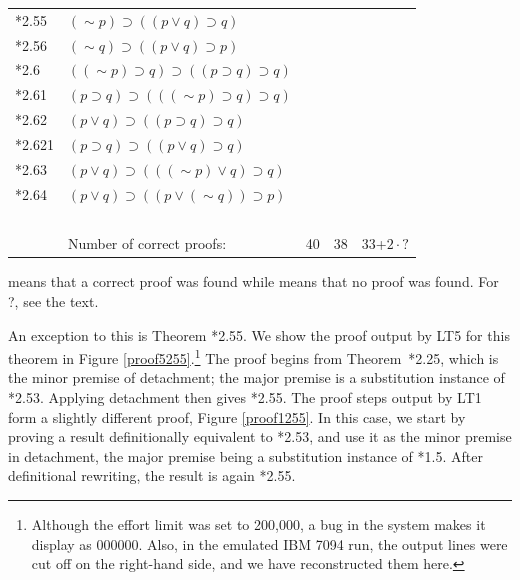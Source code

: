 \documentclass{IEEEcsmag}
\begin{document}
\begin{table}[h]
\begin{tabular}{lllll}
*2.55 & $ (\sim p) \supset ((p \vee q) \supset q) $ & \Y & \ & \Y \\
*2.56 & $ (\sim q) \supset ((p \vee q) \supset p) $ & \Y & \ & \N \\
*2.6 & $( (\sim p) \supset q) \supset ((p \supset q) \supset q) $ & \N & \ & \N \\
*2.61 & $(p \supset q) \supset (( (\sim p) \supset q) \supset q)$ & \Y & \ & \Y \\
*2.62 & $(p \vee q) \supset ((p \supset q) \supset q) $ & \Y & \ & \Y \\
*2.621 & $(p \supset q) \supset ((p \vee q) \supset q) $ & \Y & \ & \Y \\
*2.63 & $(p \vee q) \supset (( (\sim p) \vee q) \supset q) $ & \Y & \ & \Y \\
*2.64 & $(p \vee q) \supset ((p \vee (\sim q)) \supset p) $ & \N & \ & \N \\
\ & \ & \ & \ & \ \\
\ & Number of correct proofs: & 40 & 38 & 33+$2\cdot ?$ \\
\bottomrule
\end{tabular}
\begin{center} \Y{} means that a correct proof was found while \N{} means that no
proof was found.  For ?, see the text.
\end{center}
\end{table}

An exception to this is Theorem *2.55.  We show the proof output by LT5
for this theorem in Figure
\ref{proof5255}.\footnote{Although the effort limit was set to 200,000, a bug in the system makes it display as 000000.  Also, in the emulated IBM 7094 run, the output lines were cut off on the right-hand side, and we have reconstructed them here.}
The proof begins from Theorem~*2.25, which is the minor premise
of detachment; the major premise is a substitution instance of
*2.53.  Applying detachment then gives *2.55.  The proof steps
output by LT1 form a slightly different proof, Figure \ref{proof1255}.
In this case, we start by proving a result definitionally equivalent to *2.53, and
use it as the minor premise in detachment, the major premise being a substitution
instance of *1.5.  After definitional rewriting, the result is again *2.55.
\end{document}

